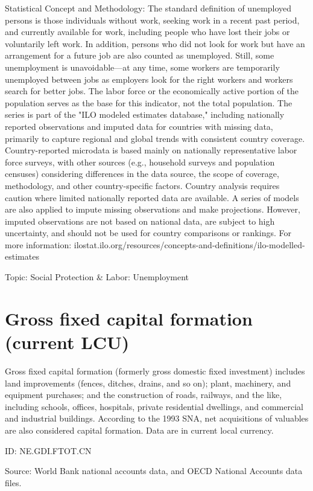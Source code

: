 \documentclass[a4paper]{article}
\begin{document}
Statistical Concept and Methodology: The standard definition of unemployed persons is those individuals without work, seeking work in a recent past period, and currently available for work, including people who have lost their jobs or voluntarily left work. In addition, persons who did not look for work but have an arrangement for a future job are also counted as unemployed. Still, some unemployment is unavoidable—at any time, some workers are temporarily unemployed between jobs as employers look for the right workers and workers search for better jobs. The labor force or the economically active portion of the population serves as the base for this indicator, not the total population. The series is part of the "ILO modeled estimates database," including nationally reported observations and imputed data for countries with missing data, primarily to capture regional and global trends with consistent country coverage. Country-reported microdata is based mainly on nationally representative labor force surveys, with other sources (e.g., household surveys and population censuses) considering differences in the data source, the scope of coverage, methodology, and other country-specific factors. Country analysis requires caution where limited nationally reported data are available. A series of models are also applied to impute missing observations and make projections. However, imputed observations are not based on national data, are subject to high uncertainty, and should not be used for country comparisons or rankings. For more information: ilostat.ilo.org/resources/concepts-and-definitions/ilo-modelled-estimates

Topic: Social Protection \& Labor: Unemployment

\section{Gross fixed capital formation (current LCU)}
Gross fixed capital formation (formerly gross domestic fixed investment) includes land improvements (fences, ditches, drains, and so on); plant, machinery, and equipment purchases; and the construction of roads, railways, and the like, including schools, offices, hospitals, private residential dwellings, and commercial and industrial buildings. According to the 1993 SNA, net acquisitions of valuables are also considered capital formation. Data are in current local currency.

ID: NE.GDI.FTOT.CN

Source: World Bank national accounts data, and OECD National Accounts data files.
\end{document}
